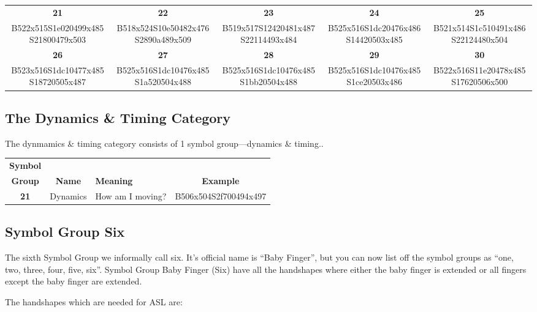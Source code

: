 \documentclass{article}
\begin{document}
\begin{center}
\begin{tabular}{*{5}{c}}
\textbf{21}&\textbf{22}&\textbf{23}&\textbf{24}&\textbf{25}\\
B522x515S1e020499x485S21800479x503&
B518x524S10e50482x476S2890a489x509&
B519x517S12420481x487S22114493x484&
B525x516S1dc20476x486S14420503x485&
B521x514S1c510491x486S22124480x504\\
\textbf{26}&\textbf{27}&\textbf{28}&\textbf{29}&\textbf{30}\\
B523x516S1dc10477x485S18720505x487&
B525x516S1dc10476x485S1a520504x488&
B525x516S1dc10476x485S1bb20504x488&
B525x516S1dc10476x485S1ce20503x486&
B522x516S11e20478x485S17620506x500\\
\end{tabular}
\end{center}

\subsection{The Dynamics \& Timing Category}

The dynmamics \& timing category consists of 1 symbol group---dynamics \& timing..

\begin{center}
\begin{tabular}{ccp{21mm}c}
\textbf{Symbol}\\
\textbf{Group}&\textbf{Name}&\textbf{Meaning}&\textbf{Example}\\
\textbf{21}&Dynamics&How am I moving?&B506x504S2f700494x497\\
\end{tabular}
\end{center}

\subsection{Symbol Group Six}

The sixth Symbol Group we informally call six.
It's official name is ``Baby Finger'', but you can now list off the symbol groups as ``one, two, three, four, five, six''.
Symbol Group Baby Finger (Six) have all the handshapes where either the baby finger is extended or all fingers except the baby finger are extended.

The handshapes which are needed for ASL are:
\end{document}
